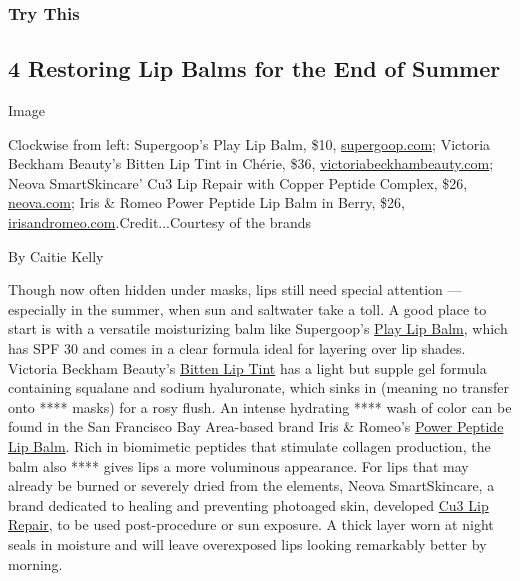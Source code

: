 \hypertarget{try-this}{%
\subsubsection{Try This}\label{try-this}}

\hypertarget{4-restoring-lip-balms-for-the-end-of-summer}{%
\subsection{4 Restoring Lip Balms for the End of
Summer}\label{4-restoring-lip-balms-for-the-end-of-summer}}

Image

Clockwise from left: Supergoop's Play Lip Balm, \$10,
\href{https://supergoop.com/products/fusion-lip-balm-with-acai?variant=31342124204130\&gclsrc=aw.ds\&\&gclid=EAIaIQobChMIjcGTs6mY6wIVFsDICh2eZw-QEAQYASABEgKAA_D_BwE\&gclsrc=aw.ds}{supergoop.com};
Victoria Beckham Beauty's Bitten Lip Tint in Chérie, \$36,
\href{https://www.victoriabeckhambeauty.com/products/bitten-lip-tint/?gallery=0\&variant=bisou}{victoriabeckhambeauty.com};
Neova SmartSkincare' Cu3 Lip Repair with Copper Peptide Complex, \$26,
\href{https://www.neova.com/collections/eye-neck-lip/products/cu3-lip-repair-new}{neova.com;}
Iris \& Romeo Power Peptide Lip Balm in Berry, \$26,
\href{https://www.irisandromeo.com/products/power-peptide-lip-balm}{irisandromeo.com}.Credit...Courtesy
of the brands

By Caitie Kelly

Though now often hidden under masks, lips still need special attention
--- especially in the summer, when sun and saltwater take a toll. A good
place to start is with a versatile moisturizing balm like Supergoop's
\href{https://supergoop.com/products/fusion-lip-balm-with-acai?variant=31342124204130\&gclsrc=aw.ds\&\&gclid=EAIaIQobChMIzazege6Y6wIVBI7ICh1xSwVxEAQYASABEgJdOfD_BwE\&gclsrc=aw.ds}{Play
Lip Balm}, which has SPF 30 and comes in a clear formula ideal for
layering over lip shades. Victoria Beckham Beauty's
\href{https://www.victoriabeckhambeauty.com/products/bitten-lip-tint/?gallery=0\&variant=bisou}{Bitten
Lip Tint} has a light but supple gel formula containing squalane and
sodium hyaluronate, which sinks in (meaning no transfer onto **** masks)
for a rosy flush. An intense hydrating **** wash of color can be found
in the San Francisco Bay Area-based brand Iris \& Romeo's
\href{https://www.irisandromeo.com/products/power-peptide-lip-balm}{Power
Peptide Lip Balm}. Rich in biomimetic peptides that stimulate collagen
production, the balm also **** gives lips a more voluminous appearance.
For lips that may already be burned or severely dried from the elements,
Neova SmartSkincare, a brand dedicated to healing and preventing
photoaged skin, developed
\href{https://www.neova.com/collections/eye-neck-lip/products/cu3-lip-repair-new}{Cu3
Lip Repair}, to be used post-procedure or sun exposure. A thick layer
worn at night seals in moisture and will leave overexposed lips looking
remarkably better by morning.

